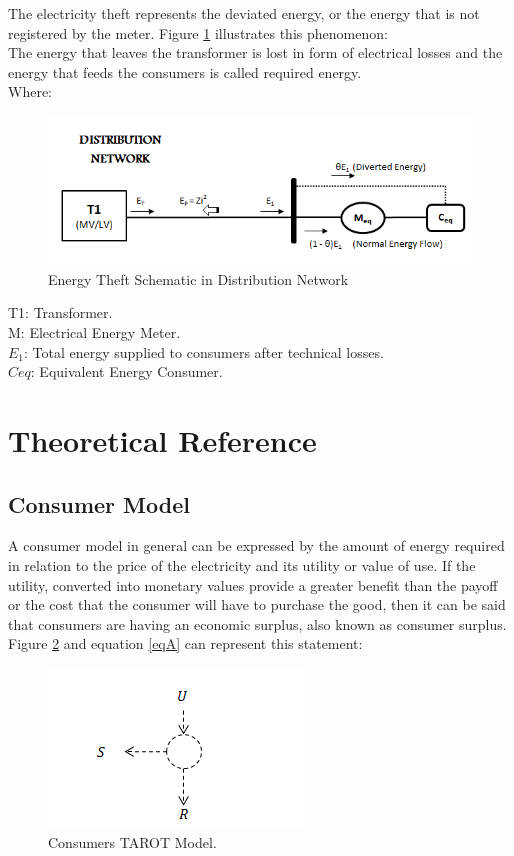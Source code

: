 \documentclass[preprint,12pt]{elsarticle}
\begin{document}
The electricity theft represents the deviated energy, or the energy that is not registered by the meter. Figure \ref{Fig2} illustrates this phenomenon:\\
The energy that leaves the transformer is lost in form of electrical losses and the energy that feeds the consumers is called required energy.\\
Where:\\

\begin{figure}[h]
\centering\includegraphics[width=0.8\linewidth]{Fig2.png}
\caption{Energy Theft Schematic in Distribution Network}
\label{Fig2}
\end{figure}

T1: Transformer.\\
M: Electrical Energy Meter.\\
$E_1$: Total energy supplied to consumers after technical losses.\\
$Ceq$: Equivalent Energy Consumer.\\

\section{Theoretical Reference}
\label{S:2}

\subsection{Consumer Model}
\label{SS:2-1}

A consumer model in general can be expressed by the amount of energy required in relation to the price of the electricity and its utility or value of use. If the utility, converted into monetary values provide a greater benefit than the payoff or the cost that the consumer will have to purchase the good, then it can be said that consumers are having an economic surplus, also known as consumer surplus. Figure \ref{Fig3} and equation \ref{eqA} can represent this statement:

\begin{figure}[h]%
\centering
\includegraphics[scale=1]{Fig3.png} 
\caption{Consumers TAROT Model.}
\label{Fig3}
\end{figure}
\end{document}
